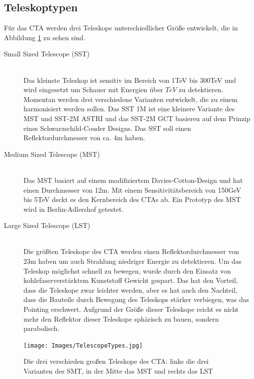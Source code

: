\subsection{Teleskoptypen}
Für das CTA werden drei Teleskope unterschiedlicher Größe entwickelt, die in Abbildung \ref{img:TelescopeTypes} zu sehen sind.
\begin{description}
\item[Small Sized Telescope (SST)]\hfill \\
Das kleinste Teleskop ist sensitiv im Bereich von 1TeV bis 300TeV und wird eingesetzt um Schauer mit Energien über $\unit{TeV}$ zu detektieren. Momentan werden drei verschiedene Varianten entwickelt, die zu einem harmonisiert werden sollen. Das SST 1M ist eine kleinere Variante des MST und SST-2M  ASTRI und das SST-2M GCT basieren auf dem Prinzip eines Schwarzschild-Couder Designs. Das SST soll einen Reflektordurchmesser von ca. 4m haben.
\item[Medium Sized Telescope (MST)]\hfill \\ 
Das MST basiert auf einem modifiziertem Davies-Cotton-Design und hat einen Durchmesser von 12m. Mit einem Sensitivitätsbereich von 150GeV bis 5TeV deckt es den Kernbereich des CTAs ab. Ein Prototyp des MST wird in Berlin-Adlershof getestet.
\item[Large Sized Telescope (LST)]\hfill \\
Die größten Teleskope des CTA werden einen Reflektordurchmesser von 23m haben um auch Strahlung niedriger Energie zu detektieren. Um das Teleskop möglichst schnell zu bewegen, wurde durch den Einsatz von kohlefaserverstärktem Kunststoff Gewicht gespart. Das hat den Vorteil, dass die Teleskope zwar leichter werden, aber es hat auch den Nachteil, dass die Bauteile durch Bewegung des Teleskops stärker verbiegen, was das Pointing erschwert. Aufgrund der Größe dieser Teleskope reicht es nicht mehr den Reflektor dieser Teleskope sphärisch zu bauen, sondern parabolisch.%
\end{description}
\begin{figure}[htbp]
\centering
\texttt{[image: Images/TelescopeTypes.jpg]}
\caption{Die drei verschieden großen Teleskope des CTA: links die drei Varianten des SMT, in der Mitte das MST und rechts das LST \cite{Flickr}}
\label{img:TelescopeTypes}
\end{figure}

